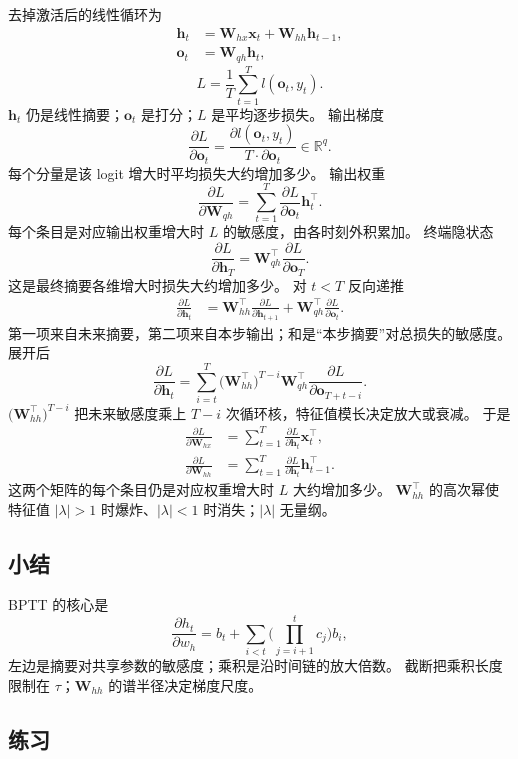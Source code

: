 去掉激活后的线性循环为
\begin{align*}
\bm{h}_t&=\bm{W}_{hx}\bm{x}_t+\bm{W}_{hh}\bm{h}_{t-1},
\\
\bm{o}_t&=\bm{W}_{qh}\bm{h}_t,
\end{align*}
\[
L=\frac{1}{T}\sum_{t=1}^{T}l(\bm{o}_t,y_t).
\]
$\bm{h}_t$ 仍是线性摘要；$\bm{o}_t$ 是打分；$L$ 是平均逐步损失。
输出梯度
\[
\frac{\partial L}{\partial\bm{o}_t}
=
\frac{\partial l(\bm{o}_t,y_t)}{T\cdot\partial\bm{o}_t}
\in\mathbb{R}^{q}.
\]
每个分量是该 logit 增大时平均损失大约增加多少。
输出权重
\[
\frac{\partial L}{\partial\bm{W}_{qh}}
=
\sum_{t=1}^{T}
\frac{\partial L}{\partial\bm{o}_t}\bm{h}_t^{\top}.
\]
每个条目是对应输出权重增大时 $L$ 的敏感度，由各时刻外积累加。
终端隐状态
\[
\frac{\partial L}{\partial\bm{h}_T}
=
\bm{W}_{qh}^{\top}\frac{\partial L}{\partial\bm{o}_T}.
\]
这是最终摘要各维增大时损失大约增加多少。
对 $t<T$ 反向递推
\begin{align*}
\frac{\partial L}{\partial\bm{h}_t}
&=
\bm{W}_{hh}^{\top}\frac{\partial L}{\partial\bm{h}_{t+1}}
+
\bm{W}_{qh}^{\top}\frac{\partial L}{\partial\bm{o}_t}.
\end{align*}
第一项来自未来摘要，第二项来自本步输出；和是“本步摘要”对总损失的敏感度。
展开后
\[
\frac{\partial L}{\partial\bm{h}_t}
=
\sum_{i=t}^{T}
\bigl(\bm{W}_{hh}^{\top}\bigr)^{T-i}
\bm{W}_{qh}^{\top}
\frac{\partial L}{\partial\bm{o}_{T+t-i}}.
\]
$\bigl(\bm{W}_{hh}^{\top}\bigr)^{T-i}$ 把未来敏感度乘上 $T-i$ 次循环核，特征值模长决定放大或衰减。
于是
\begin{align*}
\frac{\partial L}{\partial\bm{W}_{hx}}
&=
\sum_{t=1}^{T}
\frac{\partial L}{\partial\bm{h}_t}\bm{x}_t^{\top},
\\
\frac{\partial L}{\partial\bm{W}_{hh}}
&=
\sum_{t=1}^{T}
\frac{\partial L}{\partial\bm{h}_t}\bm{h}_{t-1}^{\top}.
\end{align*}
这两个矩阵的每个条目仍是对应权重增大时 $L$ 大约增加多少。
$\bm{W}_{hh}^{\top}$ 的高次幂使特征值 $|\lambda|>1$ 时爆炸、$|\lambda|<1$ 时消失；$|\lambda|$ 无量纲。

\subsection{小结}

BPTT 的核心是
\[
\frac{\partial h_t}{\partial w_h}
=
b_t+\sum_{i<t}\Biggl(\prod_{j=i+1}^{t}c_j\Biggr)b_i,
\]
左边是摘要对共享参数的敏感度；乘积是沿时间链的放大倍数。
截断把乘积长度限制在 $\tau$；$\bm{W}_{hh}$ 的谱半径决定梯度尺度。

\subsection{练习}

